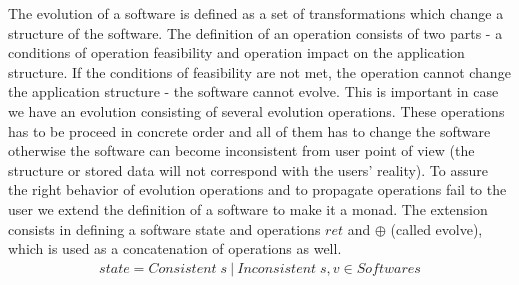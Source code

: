\documentclass[11pt]{article}
\begin{document}
The evolution of a software is defined as a set of transformations which change a structure of the software. The definition of an operation consists of two parts - a conditions of operation feasibility and operation impact on the application structure. If the conditions of feasibility are not met, the operation cannot change the application structure - the software cannot evolve. This is important in case we have an evolution consisting of several evolution operations. These operations has to be proceed in concrete order and all of them has to change the software otherwise the software can become inconsistent from user point of view (the structure or stored data will not correspond with the users' reality). To assure the right behavior of evolution operations and to propagate operations fail to the user we extend the definition of a software to make it a monad. The extension consists in defining a software state and operations $ret$ and $\oplus$ (called evolve), which is used as a concatenation of operations as well.
\begin{gather*}
state = Consistent \; s \: | \: Inconsistent \; s, v \in Softwares 
\end{gather*}
\end{document}
